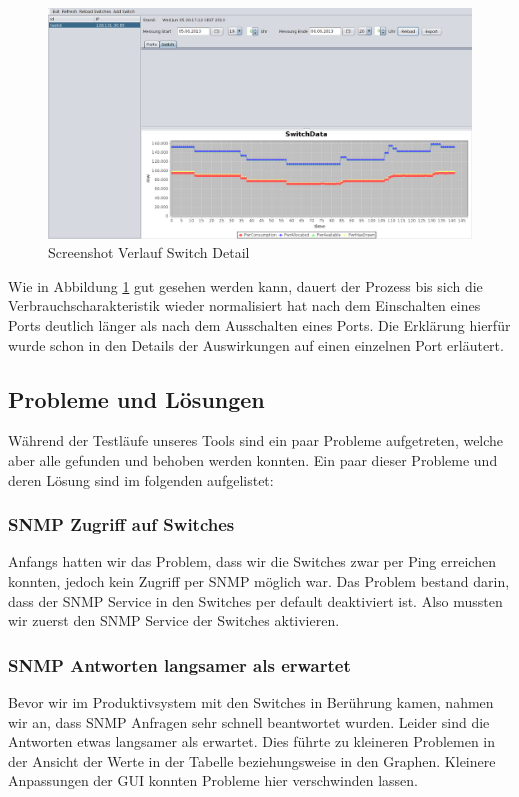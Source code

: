 \begin{figure}[h]
    \centering
    \leavevmode
    \includegraphics[width=1.0\linewidth]{figures/switchDetails}
    \caption{Screenshot Verlauf Switch Detail}
    \label{fig:switchDetails}
\end{figure}

Wie in Abbildung \ref{fig:switchDetails} gut gesehen werden kann, dauert der Prozess bis sich die Verbrauchscharakteristik wieder normalisiert hat nach dem Einschalten eines Ports deutlich länger als nach dem Ausschalten eines Ports. Die Erklärung hierfür wurde schon in den Details der Auswirkungen auf einen einzelnen Port erläutert.

\subsection{Probleme und Lösungen}
Während der Testläufe unseres Tools sind ein paar Probleme aufgetreten, welche aber alle gefunden und behoben werden konnten. Ein paar dieser Probleme und deren Lösung sind im folgenden aufgelistet:

\subsubsection*{SNMP Zugriff auf Switches}
Anfangs hatten wir das Problem, dass wir die Switches zwar per Ping erreichen konnten, jedoch kein Zugriff per SNMP möglich war. Das Problem bestand darin, dass der SNMP Service in den Switches per default deaktiviert ist. Also mussten wir zuerst den SNMP Service der Switches aktivieren.

\subsubsection*{SNMP Antworten langsamer als erwartet}
Bevor wir im Produktivsystem mit den Switches in Berührung kamen, nahmen wir an, dass SNMP Anfragen sehr schnell beantwortet wurden. Leider sind die Antworten etwas langsamer als erwartet. Dies führte zu kleineren Problemen in der Ansicht der Werte in der Tabelle beziehungsweise in den Graphen. Kleinere Anpassungen der GUI konnten Probleme hier verschwinden lassen.

